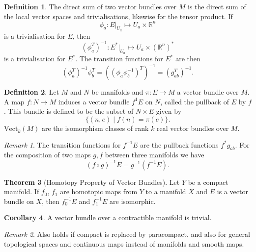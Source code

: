 \documentclass[twocolumn]{article}
\theoremstyle{definition}
\newtheorem{definition}{Definition}[section]
\newtheorem{theorem}[definition]{Theorem}
\newtheorem{corollary}[definition]{Corollary}
\theoremstyle{remark}
\newtheorem*{remark}{Remark}
\begin{document}
\begin{definition}
    The direct sum of two vector bundles over $M$ is the direct sum of the local vector spaces and trivialisations,
    likewise for the tensor product. If
    \begin{equation}
        \phi_a : E|_{U_a} \mapsto U_a \times \mathbb{R}^n
    \end{equation}
    is a trivialisation for $E$, then
    \begin{equation}
        (\phi_a^T)^{-1} : E^*|_{U_a} \mapsto U_a \times \left(\mathbb{R}^n\right)^*
    \end{equation}
    is a trivialisation for $E^*$. The transition functions for $E^*$ are then
    \begin{equation}
        (\phi_a^T)^{-1} \phi_b^T = ((\phi_a \phi_b^{-1})^T)^{-1} = (g^T_{ab})^{-1}.
    \end{equation}
\end{definition}
\begin{definition}
    Let $M$ and $N$ be manifolds and $\pi: E \rightarrow M$ a vector bundle over $M$.
    A map $f: N \rightarrow M$ induces a vector bundle $f^{1}E$ on $N$, called the pullback of $E$ by $f$.
    This bundle is defined to be the subset of $N \times E$ given by
    \begin{equation}
        \{ (n, e) \mid  f(n) = \pi(e) \}.
    \end{equation}
    $\text{Vect}_k(M)$ are the isomorphism classes of rank $k$ real vector bundles over $M$.
\end{definition}
\begin{remark}
    The transition functions for $f^{-1}E$ are the pullback functions $f^*g_{ab}$.
    For the composition of two maps $g, f$ between three manifolds we have
    \begin{equation}
        (f \circ g)^{-1} E = g^{-1}(f^{-1}E).
    \end{equation}
\end{remark}
\begin{theorem}[Homotopy Property of Vector Bundles]
    Let $Y$ be a compact manifold. If $f_0$, $f_1$ are homotopic maps from $Y$ to a manifold $X$ and $E$ is a vector bundle on $X$,
    then $f_0^{-1}E$ and $f_1^{-1}E$ are isomorphic.
\end{theorem}
\begin{corollary}
    A vector bundle over a contractible manifold is trivial.
\end{corollary}
\begin{remark}
    Also holds if compact is replaced by paracompact, and also for general topological spaces and continuous maps instead of manifolds and smooth maps.
\end{remark}
\end{document}
